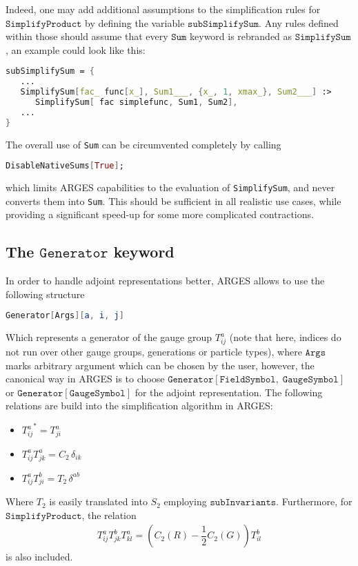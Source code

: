 \documentclass{scrartcl}
\begin{document}
Indeed, one may add additional assumptions to the simplification rules for $\mathtt{SimplifyProduct}$ by defining the variable $\mathtt{subSimplifySum}$. Any rules defined within those should assume that every $\mathtt{Sum}$ keyword is rebranded as $\mathtt{SimplifySum}$, an example could look like this:
\begin{lstlisting}[language=mathematica,mathescape,columns=flexible,backgroundcolor=\color{light-gray}]
subSimplifySum = {
   ...
   SimplifySum[fac_ func[x_], Sum1___, {x_, 1, xmax_}, Sum2___] :> 
      SimplifySum[ fac simplefunc, Sum1, Sum2],
   ...
}
\end{lstlisting}
The overall use of \texttt{Sum} can be circumvented completely by calling
\begin{lstlisting}[language=mathematica,mathescape,columns=flexible,backgroundcolor=\color{light-gray}]
DisableNativeSums[True];
\end{lstlisting}
which limits ARGES capabilities to the evaluation of \texttt{SimplifySum}, and never converts them into \texttt{Sum}. This should be sufficient in all realistic use cases, while providing a significant speed-up for some more complicated contractions. 
\subsection{The $\mathtt{Generator}$ keyword}
In order to handle adjoint representations better, ARGES allows to use the following structure
\begin{lstlisting}[language=mathematica,mathescape,columns=flexible,backgroundcolor=\color{light-gray}]
Generator[Args][a, i, j]
\end{lstlisting}
Which represents a generator of the gauge group $T^a_{ij}$ (note that here, indices do not run over other gauge groups, generations or particle types), where $\mathtt{Args}$ marks arbitrary argument which can be chosen by the user, however, the canonical way in ARGES is to choose $\mathtt{Generator}[\mathtt{FieldSymbol},\;\mathtt{GaugeSymbol}]$ or $\mathtt{Generator}[\mathtt{GaugeSymbol}]$ for the adjoint representation.
The following relations are build into the simplification algorithm in ARGES:
\begin{itemize}
\item ${T^a_{ij}}^* = T^a_{ji}$
\item $T^a_{ij} T^a_{jk} = C_2\, \delta_{ik}$
\item $T^a_{ij} T^b_{ji} = T_2\, \delta^{ab}$
\end{itemize}
Where $T_2$ is easily translated into $S_2$ employing $\mathtt{subInvariants}$. Furthermore, for $\mathtt{SimplifyProduct}$, the relation
\begin{align*}
T^a_{ij} T^b_{jk} T^a_{kl} = \left(C_2(R) - \dfrac{1}{2} C_2(G)\right) T^b_{il}
\end{align*}
is also included.
\newpage
\end{document}
